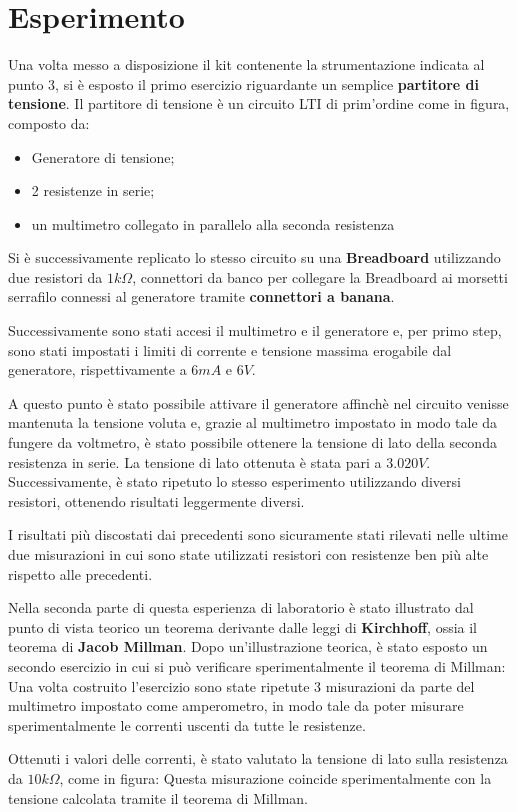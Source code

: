     \section{Esperimento}
    Una volta messo a disposizione il kit contenente la strumentazione indicata al punto $3$, %
    si è esposto il primo esercizio riguardante un semplice \textbf{partitore di tensione}.
    Il partitore di tensione è un circuito LTI di prim'ordine come in figura, composto da:
    \begin{itemize}
        \item Generatore di tensione;
        \item 2 resistenze in serie;
        \item un multimetro collegato in parallelo alla seconda resistenza
    \end{itemize}
    Si è successivamente replicato lo stesso circuito su una \textbf{Breadboard} utilizzando due resistori da
    $1k\Omega$, connettori da banco per collegare la Breadboard ai morsetti serrafilo connessi al generatore
    tramite \textbf{connettori a banana}. \par
    Successivamente sono stati accesi il multimetro e il generatore e, per primo step, sono stati impostati i limiti di corrente e tensione massima
    erogabile dal generatore, rispettivamente a $6mA$ e $6V$.\par
    A questo punto è stato possibile attivare il generatore affinchè nel circuito venisse mantenuta la tensione voluta e,
    grazie al multimetro impostato in modo tale da fungere da voltmetro, è stato possibile ottenere la tensione di lato della
    seconda resistenza in serie. La tensione di lato ottenuta è stata pari a $3.020V$.
    Successivamente, è stato ripetuto lo stesso esperimento utilizzando diversi resistori, ottenendo risultati leggermente diversi.\par
    I risultati più discostati dai precedenti sono sicuramente stati rilevati nelle ultime due misurazioni in cui sono state utilizzati
    resistori con resistenze ben più alte rispetto alle precedenti.\par
    \par
    Nella seconda parte di questa esperienza di laboratorio è stato illustrato dal punto di vista teorico
    un teorema derivante dalle leggi di \textbf{Kirchhoff}, ossia il teorema di \textbf{Jacob Millman}.
    Dopo un'illustrazione teorica, è stato esposto un secondo esercizio in cui si può verificare sperimentalmente il teorema di Millman:
    Una volta costruito l'esercizio sono state ripetute 3 misurazioni da parte del multimetro impostato come 
    amperometro, in modo tale da poter misurare sperimentalmente le correnti uscenti da tutte le resistenze.\par
    Ottenuti i valori delle correnti, è stato valutato la tensione di lato sulla resistenza da $10k\Omega$, come in figura:
    Questa misurazione coincide sperimentalmente con la tensione calcolata tramite il teorema di Millman.\par

